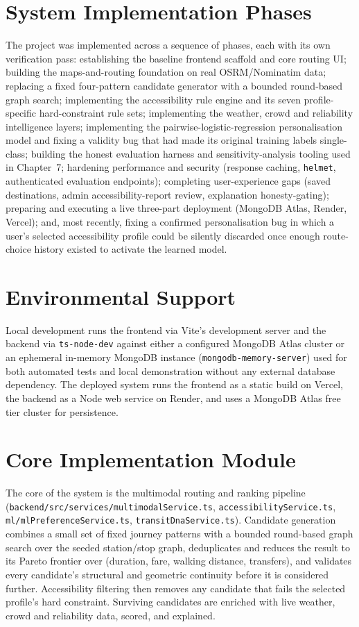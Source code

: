 \documentclass[12pt,a4paper]{report}
\begin{document}
\section{System Implementation Phases}

The project was implemented across a sequence of phases, each with its own verification pass:
establishing the baseline frontend scaffold and core routing UI; building the maps-and-routing
foundation on real OSRM/Nominatim data; replacing a fixed four-pattern candidate generator with a
bounded round-based graph search; implementing the accessibility rule engine and its seven
profile-specific hard-constraint rule sets; implementing the weather, crowd and reliability
intelligence layers; implementing the pairwise-logistic-regression personalisation model and fixing
a validity bug that had made its original training labels single-class; building the honest
evaluation harness and sensitivity-analysis tooling used in Chapter~7; hardening performance and
security (response caching, \texttt{helmet}, authenticated evaluation endpoints); completing
user-experience gaps (saved destinations, admin accessibility-report review, explanation
honesty-gating); preparing and executing a live three-part deployment (MongoDB Atlas, Render,
Vercel); and, most recently, fixing a confirmed personalisation bug in which a user's selected
accessibility profile could be silently discarded once enough route-choice history existed to
activate the learned model.

\section{Environmental Support}

Local development runs the frontend via Vite's development server and the backend via
\texttt{ts-node-dev} against either a configured MongoDB Atlas cluster or an ephemeral in-memory
MongoDB instance (\texttt{mongodb-memory-server}) used for both automated tests and local
demonstration without any external database dependency. The deployed system runs the frontend as a
static build on Vercel, the backend as a Node web service on Render, and uses a MongoDB Atlas free
tier cluster for persistence.

\section{Core Implementation Module}

The core of the system is the multimodal routing and ranking pipeline
(\texttt{backend/src/services/multimodalService.ts},
\texttt{accessibilityService.ts}, \texttt{ml/mlPreferenceService.ts},
\texttt{transitDnaService.ts}). Candidate generation combines a small set of fixed journey patterns
with a bounded round-based graph search over the seeded station/stop graph, deduplicates and reduces
the result to its Pareto frontier over (duration, fare, walking distance, transfers), and validates
every candidate's structural and geometric continuity before it is considered further. Accessibility
filtering then removes any candidate that fails the selected profile's hard constraint. Surviving
candidates are enriched with live weather, crowd and reliability data, scored, and explained.
\end{document}
